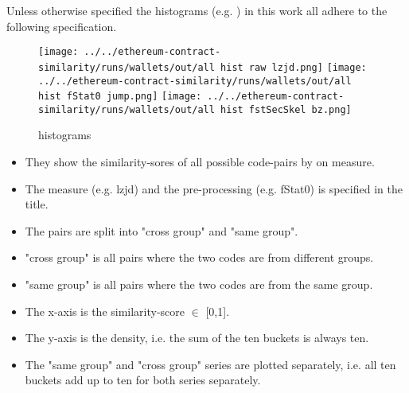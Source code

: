 \documentclass[../main.tex]{subfiles}
\begin{document}
Unless otherwise specified the histograms (e.g. ) in this work all adhere to the following specification.

\begin{figure*}[ht!]
  \centering
  \texttt{[image: ../../ethereum-contract-similarity/runs/wallets/out/all hist raw lzjd.png]}
  \texttt{[image: ../../ethereum-contract-similarity/runs/wallets/out/all hist fStat0 jump.png]}
  \texttt{[image: ../../ethereum-contract-similarity/runs/wallets/out/all hist fstSecSkel bz.png]}

  \caption{histograms}
  \label{fig:histograms}
\end{figure*}

\begin{itemize}
  \item They show the similarity-sores of all possible code-pairs by on measure.
  \item The measure (e.g. lzjd) and the pre-processing (e.g. fStat0) is specified in the title.
  \item The pairs are split into "cross group" and "same group".
  \item "cross group" is all pairs where the two codes are from different groups.
  \item "same group" is all pairs where the two codes are from the same group.
  \item The x-axis is the similarity-score \(\in\) [0,1].
  \item The y-axis is the density, i.e. the sum of the ten buckets is always ten.
  \item The "same group" and "cross group" series are plotted separately, i.e. all ten buckets add up to ten for both series separately.
\end{itemize}
\end{document}
